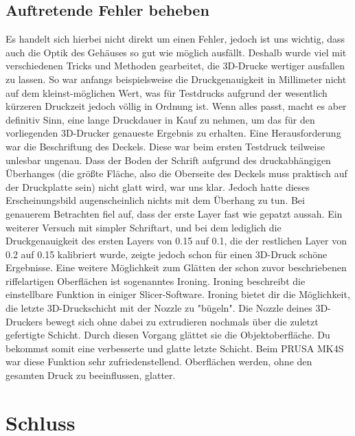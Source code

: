 \documentclass[11pt, twoside]{article}
\begin{document}
\subsection{Auftretende Fehler beheben}
Es handelt sich hierbei nicht direkt um einen Fehler, jedoch ist uns wichtig, dass auch die Optik des Gehäuses so gut wie möglich ausfällt. Deshalb wurde viel mit verschiedenen Tricks und Methoden gearbeitet, die 3D-Drucke wertiger ausfallen zu lassen.\newline
So war anfangs beispielsweise die Druckgenauigkeit in Millimeter nicht auf dem kleinst-möglichen Wert, was für Testdrucks aufgrund der wesentlich kürzeren Druckzeit jedoch völlig in Ordnung ist. Wenn alles passt, macht es aber definitiv Sinn, eine lange Druckdauer in Kauf zu nehmen, um das für den vorliegenden 3D-Drucker genaueste Ergebnis zu erhalten.\newline
Eine Herausforderung war die Beschriftung des Deckels. Diese war beim ersten Testdruck teilweise unlesbar ungenau. Dass der \glqq Boden\grqq{} der Schrift aufgrund des druckabhängigen Überhanges (die größte Fläche, also die Oberseite des Deckels muss praktisch auf der Druckplatte sein) nicht glatt wird, war uns klar. Jedoch hatte dieses Erscheinungsbild augenscheinlich nichts mit dem Überhang zu tun. Bei genauerem Betrachten fiel auf, dass der erste Layer fast wie gepatzt aussah. Ein weiterer Versuch mit simpler Schriftart, und bei dem lediglich die Druckgenauigkeit des ersten Layers von 0.15 auf 0.1, die der restlichen Layer von 0.2 auf 0.15 kalibriert wurde, zeigte jedoch schon für einen 3D-Druck schöne Ergebnisse.\newline
Eine weitere Möglichkeit zum Glätten der schon zuvor beschriebenen riffelartigen Oberflächen ist sogenanntes Ironing. \glqq Ironing beschreibt die einstellbare Funktion in einiger Slicer-Software. Ironing bietet dir die Möglichkeit, die letzte 3D-Druckschicht mit der Nozzle zu "bügeln". Die Nozzle deines 3D-Druckers bewegt sich ohne dabei zu extrudieren nochmals über die zuletzt gefertigte Schicht. Durch diesen Vorgang glättet sie die Objektoberfläche. Du bekommst somit eine verbesserte und glatte letzte Schicht.\glqq{} \parencite{noauthor_urlnl19_nodate} \newline
Beim PRUSA MK4S war diese Funktion sehr zufriedenstellend. Oberflächen werden, ohne den gesamten Druck zu beeinflussen, glatter. \newline
\vspace{4mm}\newline
\newpage
\section{Schluss}
\end{document}

